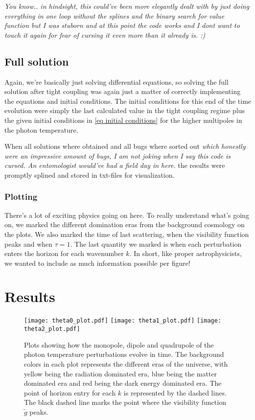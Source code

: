 \documentclass[12pt]{article}
\begin{document}
\textit{You know.. in hindsight, this could've been more elegantly dealt with by just doing everything in one loop without the splines and the binary search for value function but I was stuborn and at this point the code works and I dont want to touch it again for fear of cursing it even more than it already is. :)}

\subsection{Full solution}
Again, we're basically just solving differential equations, so solving the full solution after tight coupling was again just a matter of correctly implementing the equations and initial conditions. The initial conditions for this end of the time evolution were simply the last calculated value in the tight coupling regime plus the given initial conditions in \cref{eq initial conditions} for the higher multipoles in the photon temperature. 

When all solutions where obtained and all bugs where sorted out \textit{which honestly were an impressive amount of bugs, I am not joking when I say this code is cursed. An entomologist would've had a field day in here.} the results were promptly splined and stored in txt-files for visualization.

\subsubsection{Plotting}
There's a lot of exciting physics going on here. To really understand what's going on, we marked the different domination eras from the background cosmology on the plots. We also marked the time of last scattering, when the visibility function peaks and when $\tau=1$. The last quantity we marked is when each perturbation enters the horizon for each wavenumber $k$. In short, like proper astrophysicists, we wanted to include as much information possible per figure! 

\section{Results}


\begin{figure}[h]
    \centering
    \texttt{[image: theta0\_plot.pdf]} 
    \texttt{[image: theta1\_plot.pdf]} 
    \texttt{[image: theta2\_plot.pdf]}
    \caption{Plots showing how the monopole, dipole and quadrupole of the photon temperature perturbations evolve in time. The background colors in each plot represents the different eras of the universe, with yellow being the radiation dominated era, blue being the matter dominated era and red being the dark energy dominated era. The point of horizon entry for each $k$ is represented by the dashed lines. The black dashed line marks the point where the visibility function $\tilde{g}$ peaks. }
    \label{fig:theta}
\end{figure}
\end{document}
